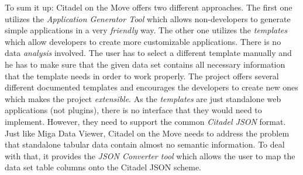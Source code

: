 To sum it up: Citadel on the Move offers two different approaches. The first one utilizes the \emph{Application Generator Tool} which allows non-developers to generate simple applications in a very \emph{friendly} way. The other one utilizes the \emph{templates} which allow developers to create more customizable applications. There is no data \emph{analysis} involved. The user has to select a different template manually and he has to make sure that the given data set contains all necessary information that the template needs in order to work properly. The project offers several different documented templates and encourages the developers to create new ones which makes the project \emph{extensible}. As the \emph{templates} are just standalone web applications (not plugins), there is no interface that they would need to implement. However, they need to support the common \emph{Citadel JSON} format. Just like Miga Data Viewer, Citadel on the Move needs to address the problem that standalone tabular data contain almost no semantic information. To deal with that, it provides the \emph{JSON Converter tool} which allows the user to map the data set table columns onto the Citadel JSON scheme.



